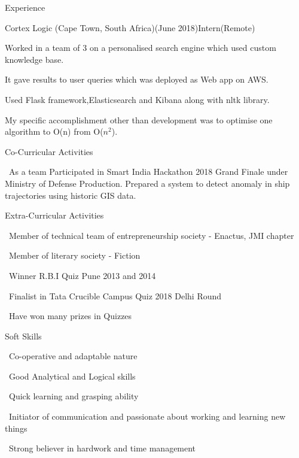 \documentclass{resume} %
\begin{document}

\begin{rSection}{Experience}

\begin{rSubsection}{Cortex Logic (Cape Town, South Africa)}{(June 2018)}{Intern(Remote)}{}
	\item Worked in a team of 3 on a personalised search engine which used custom knowledge base.
	\item It gave results to user queries which was deployed as Web app on AWS.
	\item Used Flask framework,Elasticsearch and Kibana along with nltk library.
	\item My specific accomplishment other than development was to optimise one algorithm to O(n) from O($n^{2}$).\\
\end{rSubsection}
\end{rSection}


\begin{rSection}{Co-Curricular Activities} \itemsep -2pt
\item \textbullet \ As a team Participated in Smart India Hackathon 2018 Grand Finale under Ministry of Defense Production. Prepared a system to detect anomaly in ship trajectories using historic GIS data.
\end{rSection}

\begin{rSection}{Extra-Curricular Activities} \itemsep -3pt
  \item \textbullet \ Member of technical team of entrepreneurship society - Enactus, JMI chapter
  \item \textbullet \ Member of literary society - Fiction
	\item \textbullet \ Winner R.B.I Quiz Pune 2013 and 2014
	\item \textbullet \ Finalist in Tata Crucible Campus Quiz 2018 Delhi Round
	\item \textbullet \ Have won many prizes in Quizzes
\end{rSection}

\begin{rSection}{Soft Skills}
  \itemsep -3pt
 \item \textbullet \ Co-operative and adaptable nature
 \item \textbullet \ Good Analytical and Logical skills
 \item \textbullet \ Quick learning and grasping ability 
 \item \textbullet \ Initiator of communication and passionate about working and learning new things 
 \item \textbullet \ Strong believer in hardwork and time management
\end{rSection}
\end{document}

